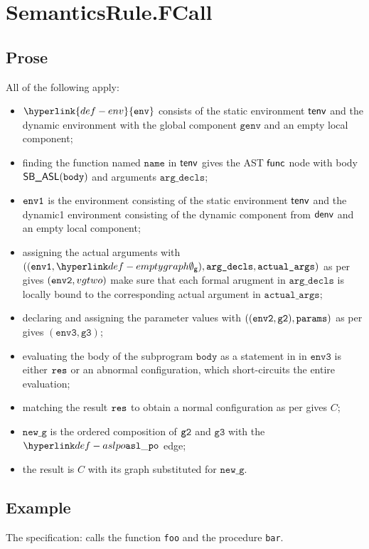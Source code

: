 \documentclass{book}
\newcommand\ProseOrAbnormal[0]{or an abnormal configuration, which short-circuits the entire evaluation}
\newcommand\env[0]{\hyperlink{def-env}{\texttt{env}}}
\newcommand\envthree[0]{\texttt{env3}}
\newcommand\newg[0]{\texttt{new\_g}}
\newcommand\vgthree[0]{\texttt{g3}}
\newcommand\name[0]{\texttt{name}}
\newcommand\actualargs[0]{\texttt{actual\_args}}
\newcommand\argdecls[0]{\texttt{arg\_decls}}
\newcommand\params[0]{\texttt{params}}
\newcommand\vbody[0]{\texttt{body}}
\newcommand\genv[0]{\texttt{genv}}
\begin{document}

\section{SemanticsRule.FCall \label{sec:SemanticsRule.FCall}}
  \subsection{Prose}
  All of the following apply:
  \begin{itemize}
    \item $\env$ consists of the static environment $\textsf{tenv}$ and the dynamic environment with the global
    component $\genv$ and an empty local component;
    \item finding the function named $\name$ in $\textsf{tenv}$ gives the AST $\textsf{func}$ node with body
    $\SBASL(\vbody)$ and arguments $\argdecls$;
    \item $\texttt{env1}$ is the environment consisting of the static environment $\textsf{tenv}$ and the dynamic1
    environment consisting of the dynamic component from $\textsf{denv}$ and an empty local component;
    \item assigning the actual arguments with $((\envone, \emptygraph), \argdecls, \actualargs)$
    as per  gives $(\texttt{env2}, vgtwo)$ make sure that each
    formal arugment in $\argdecls$ is
    locally bound to the corresponding actual argument in $\actualargs$;
    \item declaring and assigning the parameter values with $((\envtwo, \vgtwo), \params)$
    as per  gives $(\envthree, \vgthree)$;
    \item evaluating the body of the subprogram $\vbody$ as a statement in in $\envthree$
    is either $\texttt{res}$ \ProseOrAbnormal;
    \item matching the result $\texttt{res}$ to obtain a normal configuration as per 
    gives $C$;
    \item $\newg$ is the ordered composition of $\texttt{g2}$ and $\vgthree$ with the $\aslpo$ edge;
    \item the result is $C$ with its graph substituted for $\newg$.
  \end{itemize}

  \subsection{Example}
  The specification:
  calls the function \texttt{foo} and the procedure \texttt{bar}.
\end{document}
